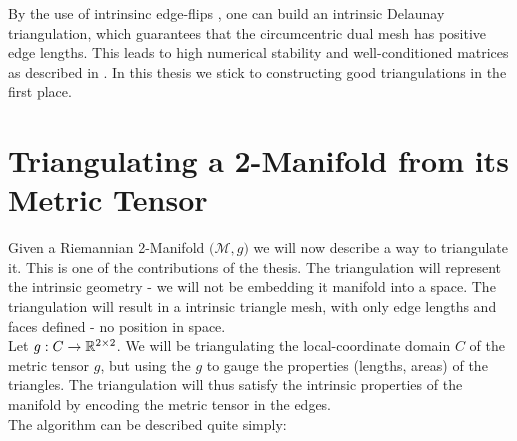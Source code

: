 {\begin{center}
        \label{fig:circumcentric_dual}
    \end{center}
    By the use of intrinsinc edge-flips \cite{sharp2021intrinsic}, one can build an intrinsic Delaunay triangulation, which guarantees that the circumcentric dual mesh has positive edge lengths. This leads to high numerical stability and well-conditioned matrices as described in \cite{intrinsic_laplacian}. In this thesis we stick to constructing good triangulations in the first place.
}
\section*{Triangulating a 2-Manifold from its Metric Tensor}
Given a Riemannian 2-Manifold $\big(\mathcal{M}, g\big)$ we will now describe a way to triangulate it. This is one of the contributions of the thesis. The triangulation will represent the intrinsic geometry - we will not be embedding it manifold into a space. The triangulation will result in a intrinsic triangle mesh, with only edge lengths and faces defined - no position in space.
\\ 
Let $g : C \to \mathbb{R}^{2\times2}$. We will be triangulating the local-coordinate domain $C$ of the metric tensor $g$, but using the $g$ to gauge the properties (lengths, areas) of the triangles. The triangulation will thus satisfy the intrinsic properties of the manifold by encoding the metric tensor in the edges.
\\
The algorithm can be described quite simply:

